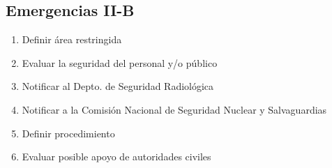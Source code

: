 \subsection*{Emergencias II-B}

\begin{enumerate}
\item Definir área restringida
\item Evaluar la seguridad del personal y/o público
\item Notificar al Depto. de Seguridad Radiológica
\item Notificar a la Comisión Nacional de Seguridad Nuclear y Salvaguardias
\item Definir procedimiento
\item Evaluar posible apoyo de autoridades civiles
\end{enumerate}
